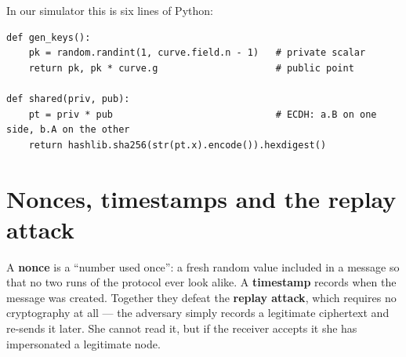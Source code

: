 In our simulator this is six lines of Python:

\begin{lstlisting}[style=py,caption={Key generation and ECDH shared-secret derivation
(\code{uwc\_simulation.py}, lines 109--118).}]
def gen_keys():
    pk = random.randint(1, curve.field.n - 1)   # private scalar
    return pk, pk * curve.g                     # public point

def shared(priv, pub):
    pt = priv * pub                             # ECDH: a.B on one side, b.A on the other
    return hashlib.sha256(str(pt.x).encode()).hexdigest()
\end{lstlisting}

\section{Nonces, timestamps and the replay attack}

A \textbf{nonce} is a ``number used once'': a fresh random value included in a message so
that no two runs of the protocol ever look alike. A \textbf{timestamp} records when the
message was created. Together they defeat the \textbf{replay attack}, which requires no
cryptography at all --- the adversary simply records a legitimate ciphertext and re-sends it
later. She cannot read it, but if the receiver accepts it she has impersonated a legitimate
node.

